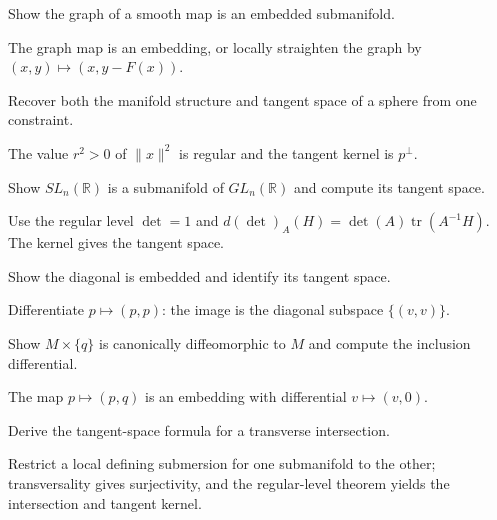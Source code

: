 \begin{problem}\label{prob:vii06-06}
Show the graph of a smooth map is an embedded submanifold.
\end{problem}
\begin{solution}
The graph map is an embedding, or locally straighten the graph by \((x,y)\mapsto(x,y-F(x))\).
\end{solution}

\begin{problem}\label{prob:vii06-07}
Recover both the manifold structure and tangent space of a sphere from one constraint.
\end{problem}
\begin{solution}
The value \(r^2>0\) of \(\|x\|^2\) is regular and the tangent kernel is \(p^\perp\).
\end{solution}

\begin{problem}\label{prob:vii06-08}
Show \(SL_n(\mathbb R)\) is a submanifold of \(GL_n(\mathbb R)\) and compute its tangent space.
\end{problem}
\begin{solution}
Use the regular level \(\det=1\) and \(d(\det)_A(H)=\det(A)\operatorname{tr}(A^{-1}H)\). The kernel gives the tangent space.
\end{solution}

\begin{problem}\label{prob:vii06-09}
Show the diagonal is embedded and identify its tangent space.
\end{problem}
\begin{solution}
Differentiate \(p\mapsto(p,p)\): the image is the diagonal subspace \(\{(v,v)\}\).
\end{solution}

\begin{problem}\label{prob:vii06-10}
Show \(M\times\{q\}\) is canonically diffeomorphic to \(M\) and compute the inclusion differential.
\end{problem}
\begin{solution}
The map \(p\mapsto(p,q)\) is an embedding with differential \(v\mapsto(v,0)\).
\end{solution}

\begin{problem}\label{prob:vii06-11}
Derive the tangent-space formula for a transverse intersection.
\end{problem}
\begin{solution}
Restrict a local defining submersion for one submanifold to the other; transversality gives surjectivity, and the regular-level theorem yields the intersection and tangent kernel.
\end{solution}

